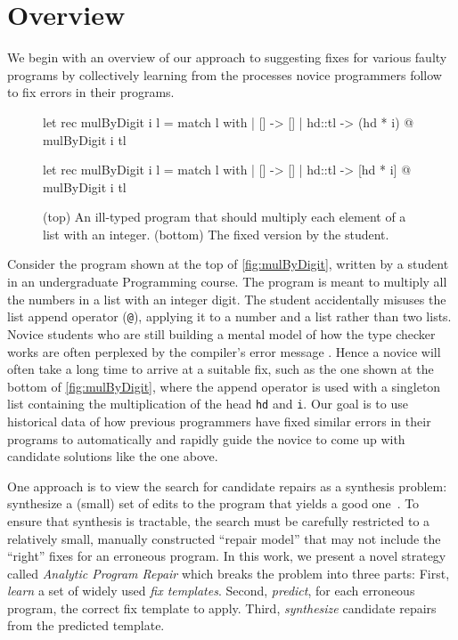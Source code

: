 \section{Overview}
\label{sec:overview}

We begin with an overview of our approach to suggesting fixes for various faulty
programs by collectively learning from the processes novice programmers follow
to fix errors in their programs.

\begin{figure}[ht]
\begin{ecode}
let rec mulByDigit i l =
  match l with
  | []     -> []
  | hd::tl -> (hd * i) @ mulByDigit i tl
\end{ecode}

\begin{ecode}
let rec mulByDigit i l =
  match l with
  | []     -> []
  | hd::tl -> [hd * i] @ mulByDigit i tl
\end{ecode}
\caption{(top) An ill-typed \ocaml program that should multiply each element
of a list with an integer. (bottom) The fixed version by the student.}
\label{fig:mulByDigit}
\end{figure}


 Consider the program \mbd shown at the top of
\autoref{fig:mulByDigit}, written by a student in an undergraduate Programming
course. The program is meant to multiply all the numbers in a list with an
integer digit. The student accidentally misuses the list append operator
(\texttt{@}), applying it to a number and a list rather than two lists.
%
Novice students who are still building a mental model of how the type checker
works are often perplexed by the compiler's error message \cite{}. Hence a
novice will often take a long time to arrive at a suitable fix, such as the one
shown at the bottom of \autoref{fig:mulByDigit}, where the append operator is
used with a singleton list containing the multiplication of the head \texttt{hd}
and \texttt{i}.
%
Our goal is to use historical data of how previous programmers have fixed
similar errors in their programs to automatically and rapidly guide the novice
to come up with candidate solutions like the one above.


%
One approach is to view the search for candidate repairs as a synthesis problem:
synthesize a (small) set of edits to the program that yields a good
one~\cite{singh2013}. %
%
To ensure that synthesis is tractable, the search must be carefully restricted
to a relatively small, manually constructed ``repair model'' that may not
include the ``right'' fixes for an erroneous program.
%
In this work, we present a novel strategy called \emph{Analytic Program Repair}
which breaks the problem into three parts:
%
First, \emph{learn} a set of widely used \emph{fix templates}.
%
Second, \emph{predict}, for each erroneous program, the correct fix template
to apply.
%
Third, \emph{synthesize} candidate repairs from the predicted template.


